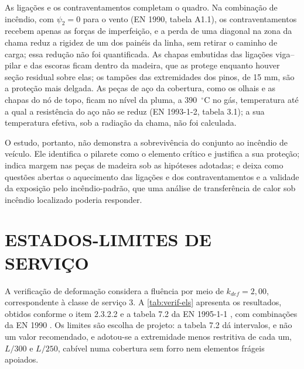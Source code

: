 As ligações e os contraventamentos completam o quadro. Na combinação de incêndio,
com $\psi_2 = 0$ para o vento (EN 1990, tabela A1.1), os contraventamentos
recebem apenas as forças de imperfeição, e a perda de uma diagonal na zona da
chama reduz a rigidez de um dos painéis da linha, sem retirar o caminho de carga;
essa redução não foi quantificada. As chapas embutidas das ligações viga--pilar e
das escoras ficam dentro da madeira, que as protege enquanto houver seção
residual sobre elas; os tampões das extremidades dos pinos, de 15 mm, são a
proteção mais delgada. As peças de aço da cobertura, como os olhais e as chapas
do nó de topo, ficam no nível da pluma, a 390~$^{\circ}$C no gás, temperatura até
a qual a resistência do aço não se reduz (EN 1993-1-2, tabela 3.1); a sua
temperatura efetiva, sob a radiação da chama, não foi calculada.

O estudo, portanto, não demonstra a sobrevivência do conjunto ao incêndio de
veículo. Ele identifica o pilarete como o elemento crítico e justifica a sua
proteção; indica margem nas peças de madeira sob as hipóteses adotadas; e deixa
como questões abertas o aquecimento das ligações e dos contraventamentos e a
validade da exposição pelo incêndio-padrão, que uma análise de transferência de
calor sob incêndio localizado poderia responder.


\section{ESTADOS-LIMITES DE SERVIÇO}\label{sec:verif-els}

A verificação de deformação considera a fluência por meio de $k_{def} = 2{,}00$,
correspondente à classe de serviço 3. A \autoref{tab:verif-els} apresenta os
resultados, obtidos conforme o item 2.3.2.2 e a tabela 7.2 da
EN 1995-1-1 \cite{EN1995-1-1:2004}, com combinações da
EN 1990 \cite{EN1990:2002}. Os limites são escolha de projeto: a tabela 7.2 dá
intervalos, e não um valor recomendado, e adotou-se a extremidade menos restritiva
de cada um, $L/300$ e $L/250$, cabível numa cobertura sem forro nem elementos
frágeis apoiados.


